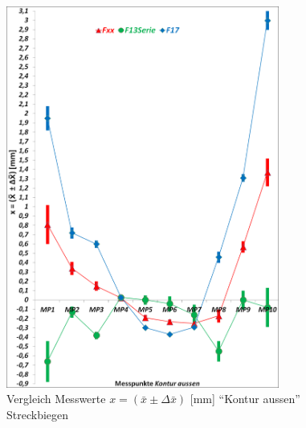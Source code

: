 \documentclass[12pt,a4paper,parskip]{scrartcl}
\begin{document}
\begin{figure}[hbtp] 
\centering
\includegraphics[width=0.8\textwidth]{mitkontausstrckb}
\caption{Vergleich Messwerte $x=(\bar{x} \pm \Delta\bar{x}) $ [mm]  "`Kontur aussen"' Streckbiegen}
\label{fig:mitstrckb}
\end{figure}

\newpage
\end{document}
